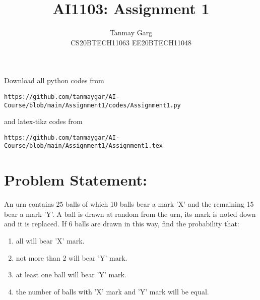 \documentclass[journal,12pt,twocolumn]{IEEEtran}
\begin{document}
     \def\rightbox#1{\makebox[0in][r]{#1}}
     \def\centbox#1{\makebox[0in]{#1}}
     \def\topbox#1{\raisebox{-\baselineskip}[0in][0in]{#1}}
     \def\midbox#1{\raisebox{-0.5\baselineskip}[0in][0in]{#1}}
\vspace{3cm}
\title{AI1103: Assignment 1}
\author{Tanmay Garg \\CS20BTECH11063 EE20BTECH11048}
\maketitle
\newpage
\bigskip
\renewcommand{\thefigure}{\theenumi}
\renewcommand{\thetable}{\theenumi}
Download all python codes from 
\begin{lstlisting}
https://github.com/tanmaygar/AI-Course/blob/main/Assignment1/codes/Assignment1.py
\end{lstlisting}
%
and latex-tikz codes from 
%
\begin{lstlisting}
https://github.com/tanmaygar/AI-Course/blob/main/Assignment1/Assignment1.tex
\end{lstlisting}

\section*{Problem Statement: }
An urn contains 25 balls of which 10 balls
bear a mark ’X’ and the remaining 15 bear a
mark ’Y’.
A ball is drawn at random from the
urn, its mark is noted down and it is replaced.
If 6 balls are drawn in this way, find the
probability that:
\begin{enumerate}
    \item all will bear 'X' mark.
    \item not more than 2 will bear 'Y' mark.
    \item at least one ball will bear 'Y' mark.
    \item the number of balls with 'X' mark and 'Y' mark will be equal.
\end{enumerate}
\end{document}
